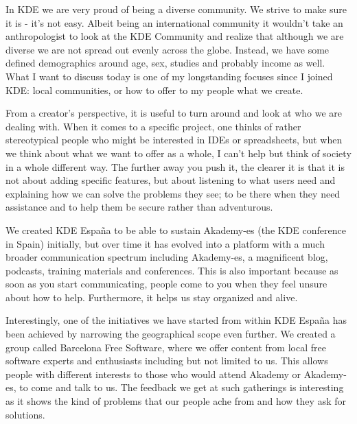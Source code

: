 

\noindent{}In KDE we are very proud of being a diverse community. We strive to make sure it is - it's not easy. Albeit being an international community it wouldn't take an anthropologist to look at the KDE Community and realize that although we are diverse we are not spread out evenly across the globe. Instead, we have some defined demographics around age, sex, studies and probably income as well. What I want to discuss today is one of my longstanding focuses since I joined KDE: local communities, or how to offer to my people what we create.

From a creator's perspective, it is useful to turn around and look at who we are dealing with. When it comes to a specific project, one thinks of rather stereotypical people who might be interested in IDEs or spreadsheets, but when we think about what we want to offer as a whole, I can't help but think of society in a whole different way. The further away you push it, the clearer it is that it is not about adding specific features, but about listening to what users need and explaining how we can solve the problems they see; to be there when they need assistance and to help them be secure rather than adventurous.

We created KDE Espa\~{n}a to be able to sustain Akademy-es (the KDE conference in Spain) initially, but over time it has evolved into a platform with a much broader communication spectrum including Akademy-es, a magnificent blog, podcasts, training materials and conferences. This is also important because as soon as you start communicating, people come to you when they feel unsure about how to help. Furthermore, it helps us stay organized and alive.

Interestingly, one of the initiatives we have started from within KDE Espa\~{n}a has been achieved by narrowing the geographical scope even further. We created a group called Barcelona Free Software, where we offer content from local free software experts and enthusiasts including but not limited to us. This allows people with different interests to those who would attend Akademy or Akademy-es, to come and talk to us. The feedback we get at such gatherings is interesting as it shows the kind of problems that our people ache from and how they ask for solutions.

